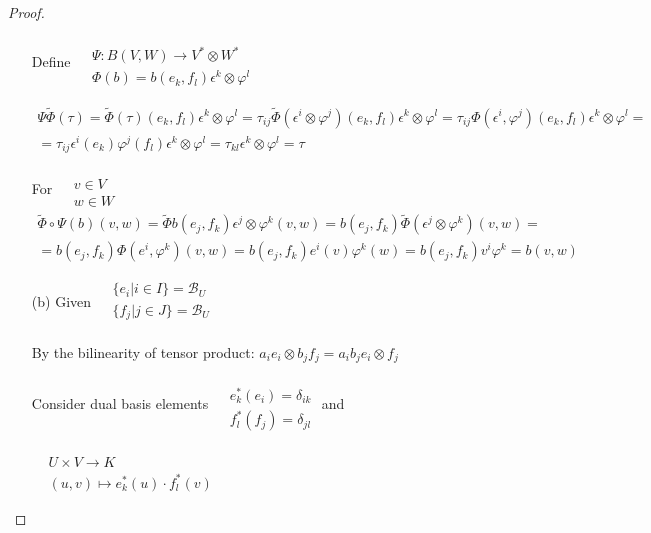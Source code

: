 \begin{proof}
\begin{enumerate}
Define $\begin{aligned} & \quad \\
  & \Psi : B(V, W) \to V^* \otimes W^* \\
  & \Phi(b) = b(e_k,  f_l) \epsilon^k \otimes \varphi^l 
\end{aligned}$

\[
\begin{gathered}
  \Psi \widetilde{\Phi}(\tau) = \widetilde{\Phi}(\tau)(e_k , f_l) \epsilon^k \otimes \varphi^l = \tau_{ij} \widetilde{\Phi}(\epsilon^i \otimes \varphi^j)(e_k , f_l) \epsilon^k \otimes \varphi^l = \tau_{ij} \Phi( \epsilon^i , \varphi^j) (e_k , f_l) \epsilon^k \otimes \varphi^l = \\
= \tau_{ij} \epsilon^i(e_k) \varphi^j(f_l) \epsilon^k\otimes \varphi^l = \tau_{kl} \epsilon^k \otimes \varphi^l = \tau
\end{gathered}
\]

For $\begin{aligned} & \quad \\ 
  & v \in V \\ 
  & w \in W \end{aligned}$
\[
\begin{gathered}
  \widetilde{\Phi} \circ \Psi(b)(v,w) = \widetilde{\Phi} b(e_j,f_k) \epsilon^j \otimes \varphi^k(v,w) = b(e_j , f_k) \widetilde{\Phi}(\epsilon^j \otimes \varphi^k)(v,w) = \\
  = b(e_j, f_k) \Phi(e^i, \varphi^k)(v,w) = b(e_j, f_k) e^i(v) \varphi^k(w) = b(e_j, f_k) v^i \varphi^k = b(v,w)
\end{gathered}
\]

\item[(b)]
Given $\begin{aligned}
  & \lbrace e_i | i \in I \rbrace = \mathcal{B}_U \\ 
  & \lbrace f_j | j \in J \rbrace = \mathcal{B}_U \\ 
\end{aligned}$

By the bilinearity of tensor product: $a_i e_i \otimes b_j f_j  = a_i b_j e_i \otimes f_j$ 

Consider dual basis elements $\begin{aligned} & \quad \\
  & e^*_k(e_i) = \delta_{ik} \\
   & f^*_l(f_j) = \delta_{jl} \end{aligned}$ and \quad 

$\begin{aligned} & \quad \\ 
  & U \times V \to K \\
  & (u,v) \mapsto e^*_k(u) \cdot f^*_l(v) \end{aligned}$


\end{enumerate}
\end{proof}
